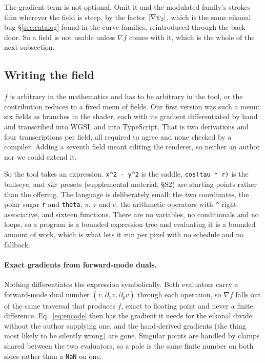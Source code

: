 The gradient term is not optional. Omit it and the modulated family's strokes
thin wherever the field is steep, by the factor $|\nabla\psi_2|$, which is the
same eikonal bug \S\ref{sec:catalog} found in the curve families,
reintroduced through the back door. So a field is not usable unless $\nabla f$
comes with it, which is the whole of the next subsection.

\subsection{Writing the field}
\label{sec:exprs}

$f$ is arbitrary in the mathematics and has to be arbitrary in the tool, or the
contribution reduces to a fixed menu of fields. Our first version was such a
menu: six fields as branches in the shader, each with its gradient
differentiated by hand and transcribed into WGSL and into TypeScript. That is
two derivations and four transcriptions per field, all required to agree and
none checked by a compiler. Adding a seventh field meant editing the renderer, so
neither an author nor we could extend it.

So the tool takes an expression. \texttt{x\^{}2 - y\^{}2} is the saddle,
\texttt{cos(tau * r)} is the bullseye, and $six$ presets
(supplemental material, \S S2) are starting points rather than
the offering. The language is deliberately small: the two coordinates, the polar
sugar \texttt{r} and \texttt{theta}, $\pi$, $\tau$ and $e$, the arithmetic
operators with \texttt{\^{}} right-associative, and sixteen functions. There are
no variables, no conditionals and no loops, so a program is a bounded expression
tree and evaluating it is a bounded amount of work, which is what lets it run
per pixel with no schedule and no fallback.

\paragraph{Exact gradients from forward-mode duals.}
Nothing differentiates the expression symbolically. Both evaluators carry a
forward-mode dual number $(v,\partial_x v,\partial_y v)$ through each operation,
so $\nabla f$ falls out of the same traversal that produces $f$, exact to
floating point and never a finite difference. Eq.~\ref{eq:encode} then has the
gradient it needs for the eikonal divide without the author supplying one, and
the hand-derived gradients (the thing most likely to be silently wrong) are
gone. Singular points are handled by clamps shared between the two
evaluators, so a pole is the same finite number on both sides rather than a
\texttt{NaN} on one.

